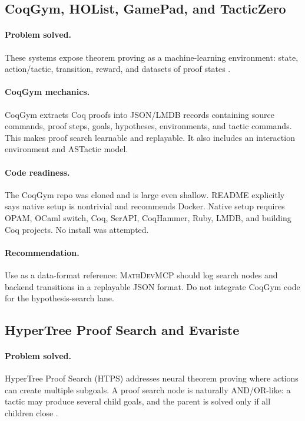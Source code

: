 \documentclass[11pt]{article}
\newcommand{\MathDevMCP}{\textsc{MathDevMCP}}
\begin{document}
\subsection{CoqGym, HOList, GamePad, and TacticZero}

\paragraph{Problem solved.}
These systems expose theorem proving as a machine-learning environment:
state, action/tactic, transition, reward, and datasets of proof states
\cite{bansal2019holist,yang2019coqgym,huang2019gamepad,wu2021tacticzero}.

\paragraph{CoqGym mechanics.}
CoqGym extracts Coq proofs into JSON/LMDB records containing source commands,
proof steps, goals, hypotheses, environments, and tactic commands. This makes
proof search learnable and replayable. It also includes an interaction
environment and ASTactic model.

\paragraph{Code readiness.}
The CoqGym repo was cloned and is large even shallow. README explicitly says
native setup is nontrivial and recommends Docker. Native setup requires OPAM,
OCaml switch, Coq, SerAPI, CoqHammer, Ruby, LMDB, and building Coq projects.
No install was attempted.

\paragraph{Recommendation.}
Use as a data-format reference: \MathDevMCP{} should log search nodes and
backend transitions in a replayable JSON format. Do not integrate CoqGym code
for the hypothesis-search lane.

\subsection{HyperTree Proof Search and Evariste}

\paragraph{Problem solved.}
HyperTree Proof Search (HTPS) addresses neural theorem proving where actions
can create multiple subgoals. A proof search node is naturally AND/OR-like: a
tactic may produce several child goals, and the parent is solved only if all
children close \cite{lample2022htps}.
\end{document}
